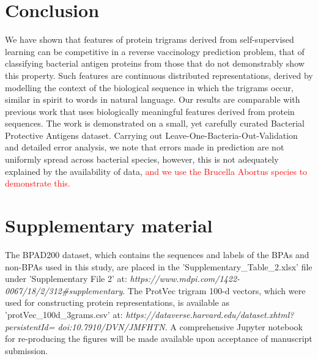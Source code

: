 \documentclass[10pt,journal,compsoc,twoside]{IEEEtran}
\begin{document}
\section{Conclusion}

We have shown that features of protein trigrams derived from self-supervised learning can be competitive in a reverse vaccinology prediction problem, that of classifying bacterial antigen proteins from those that do not demonstrably show this property. Such features are continuous distributed representations, derived by modelling the context of the biological sequence in which the trigrams occur, similar in spirit to words in natural language. Our results are comparable with previous work that uses biologically meaningful features derived from protein sequences. The work is demonstrated on a small, yet carefully curated Bacterial Protective Antigens dataset. Carrying out Leave-One-Bacteria-Out-Validation and detailed error analysis, we note that errors made in prediction are not uniformly spread across bacterial species, however, this is not adequately explained by the availability of data, \textcolor{red}{and we use the Brucella Abortus species to demonstrate this.} 


\section{Supplementary material}
The BPAD200 dataset, which contains the sequences and labels of the BPAs and non-BPAs used in this study, are placed in the 'Supplementary\_Table\_2.xlsx' file under 'Supplementary File 2' at: \textit{https://www.mdpi.com/1422-
0067/18/2/312\#supplementary}. The ProtVec trigram 100-d vectors, which were used for constructing protein representations, is available as 'protVec\_100d\_3grams.csv' at: 
\textit{https://dataverse.harvard.edu/dataset.xhtml?persistentId=
doi:10.7910/DVN/JMFHTN}. A comprehensive Jupyter notebook for re-producing the figures will be made available upon acceptance of manuscript submission.  

\ifCLASSOPTIONcaptionsoff
  \newpage
\fi
\end{document}
